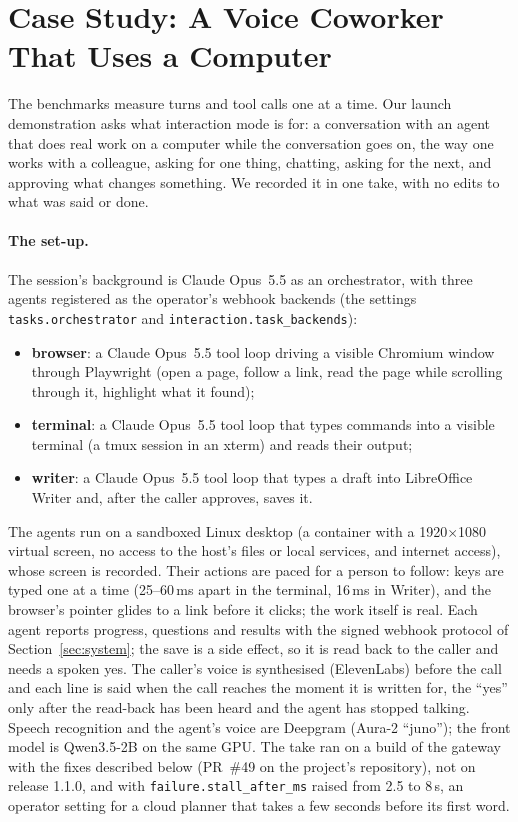\section{Case Study: A Voice Coworker That Uses a Computer}\label{sec:case}

The benchmarks measure turns and tool calls one at a time. Our launch demonstration asks what interaction mode
is for: a conversation with an agent that does real work on a computer while the conversation goes on, the way
one works with a colleague, asking for one thing, chatting, asking for the next, and approving what changes
something. We recorded it in one take, with no edits to what was said or done.

\paragraph{The set-up.} The session's background is Claude Opus~5.5 as an orchestrator, with three agents
registered as the operator's webhook backends (the settings \texttt{tasks.orchestrator} and
\texttt{interaction.task\_backends}):
\begin{itemize}
\item \textbf{browser}: a Claude Opus~5.5 tool loop driving a visible Chromium window through Playwright (open a
page, follow a link, read the page while scrolling through it, highlight what it found);
\item \textbf{terminal}: a Claude Opus~5.5 tool loop that types commands into a visible terminal (a tmux session in
an xterm) and reads their output;
\item \textbf{writer}: a Claude Opus~5.5 tool loop that types a draft into LibreOffice Writer and, after the caller
approves, saves it.
\end{itemize}
The agents run on a sandboxed Linux desktop (a container with a 1920$\times$1080 virtual screen, no access to the
host's files or local services, and internet access), whose screen is recorded. Their actions are paced for a
person to follow: keys are typed one at a time (25--60\,ms apart in the terminal, 16\,ms in Writer), and the
browser's pointer glides to a link before it clicks; the work itself is real. Each agent reports progress,
questions and results with the signed webhook protocol of Section~\ref{sec:system}; the save is a side effect, so
it is read back to the caller and needs a spoken yes. The caller's voice is synthesised (ElevenLabs) before the
call and each line is said when the call reaches the moment it is written for, the ``yes'' only after the
read-back has been heard and the agent has stopped talking. Speech recognition and the agent's voice are
Deepgram (Aura-2 ``juno''); the front model is Qwen3.5-2B on the same GPU. The take ran on a build of the gateway
with the fixes described below (PR~\#49 on the project's repository), not on release 1.1.0, and with
\texttt{failure.stall\_after\_ms} raised from 2.5 to 8\,s, an operator setting for a cloud planner that takes a few
seconds before its first word.

